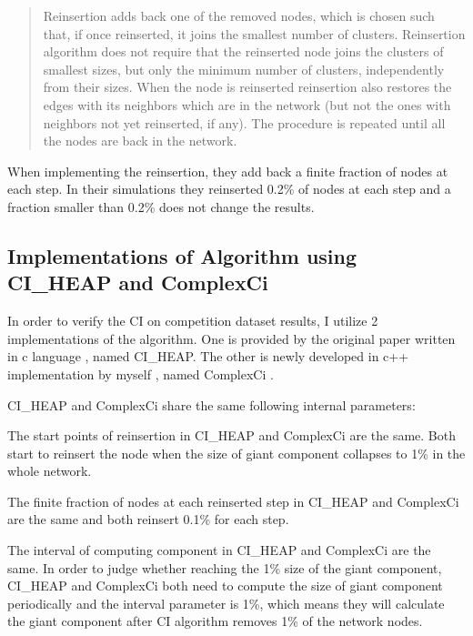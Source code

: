\documentclass{article}
\newenvironment{itquote}
{\begin{quote}\itshape}
	{\end{quote}\ignorespacesafterend}
\begin{document}
	\begin{itquote}
	
		Reinsertion adds back one of the removed nodes, which is chosen such that, if once reinserted, it joins the smallest number of clusters. Reinsertion algorithm does not require that the reinserted node joins the clusters of smallest sizes, but only the minimum number of clusters, independently from their sizes. When the node is reinserted reinsertion also restores the edges with its neighbors which are in the network (but not the ones with neighbors not yet reinserted, if any). The procedure is repeated until all the nodes are back in the network. 
	
	\end{itquote}
	
	When implementing the reinsertion, they add back a finite fraction of nodes at each step. In their simulations they reinserted 0.2\% of nodes at each step and a fraction smaller than 0.2\% does not change the results.
	
	\subsection{Implementations of Algorithm using CI\_HEAP and ComplexCi}		
	
	In order to verify the CI on competition dataset results, I utilize 2 implementations of the algorithm. One is provided by the original paper written in c language \cite{ciheapccode}, named CI\_HEAP. The other is newly developed in c++ implementation by myself \cite{zhfkt2017887989} \cite{zhfktgithub}, named ComplexCi . 
	
	CI\_HEAP and ComplexCi share the same following internal parameters:
	
	
		\begin{enumerate}
		\begin{item}
			The start points of reinsertion in CI\_HEAP and ComplexCi are the same. Both start to reinsert the node when the size of giant component collapses to 1\% in the whole network.
		\end{item}
		\begin{item}
			The finite fraction of nodes at each reinserted step in CI\_HEAP and ComplexCi are the same and both reinsert 0.1\% for each step.
		\end{item}
		\begin{item}
			The interval of computing component in CI\_HEAP and ComplexCi are the same. In order to judge whether reaching the 1\% size of the giant component, CI\_HEAP and ComplexCi both need to compute the size of giant component periodically and the interval parameter is 1\%, which means they will calculate the giant component after CI algorithm removes 1\% of the network nodes.
		\end{item}	
	\end{enumerate}	
	
\end{document}
